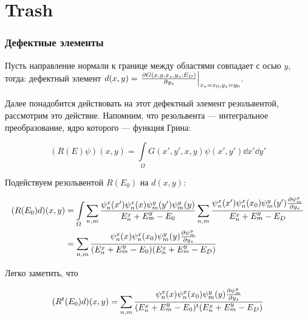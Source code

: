 \chapter{Trash}
\label{trash}

\subsection{Дефектные элементы}
Пусть направление нормали к границе между областями совпадает с осью $y$, тогда: дефектный элемент $d(x, y) = \eval{\pdv{G(x, y, x_s, y_s; E_D)}{y_s}}_{x_s = x_0, y_s = y_0}$.

Далее понадобится действовать на этот дефектный элемент резольвентой, рассмотрим это действие. Напомним, что резольвента — интегральное преобразование, ядро которого — функция Грина:

$$(R(E) \psi)(x, y) = \int\limits_\Omega G(x', y', x, y) \psi(x', y') \dd{x'} \dd{y'}$$

Подействуем резольвентой $R(E_0)$ на $d(x, y)$:

\begin{align*}
(R(E_0) d)(x, y)
&= \int\limits_\Omega \sum\limits_{n, m} \frac{\psi^x_n(x') \psi^x_n(x) \psi^y_m(y') \psi^y_m(y)}{E^x_n + E^y_m - E_0} \sum\limits_{n, m} \frac{\psi_n^x(x') \psi_n^x(x_0) \psi_m^y(y') \pdv{\psi_m^y}{y_s} (y_0)}{E^x_n + E^y_m - E_D} \\
&= \sum\limits_{n, m} \frac{\psi_n^x(x) \psi_n^x(x_0) \psi_m^y(y) \pdv{\psi_m^y}{y_s} (y_0)}{(E^x_n + E^y_m - E_0)(E^x_n + E^y_m - E_D)} \\
\end{align*}

Легко заметить, что 

\[
(R^t(E_0) d)(x, y)
= \sum\limits_{n, m} \frac{\psi_n^x(x) \psi_n^x(x_0) \psi_m^y(y) \pdv{\psi_m^y}{y_s} (y_0)}{(E^x_n + E^y_m - E_0)^t(E^x_n + E^y_m - E_D)}
\]

